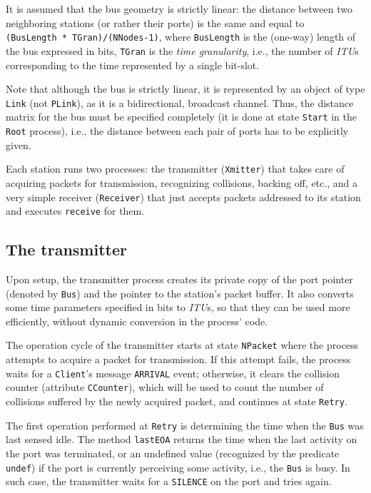 It is assumed that the bus geometry is strictly linear: the distance between
two neighboring stations (or rather their ports) is the same and equal to
{\tt (BusLength~*~TGran)/(NNodes-1)}, where {\tt BusLength} is the (one-way)
length of the bus expressed in bits, {\tt TGran} is the {\em time granularity},
i.e., the number of {\em ITU\/}s corresponding to the time represented by a
single bit-slot.

Note that although the bus is strictly linear, it is represented by an
object of type {\tt Link} (not {\tt PLink}), as it is a bidirectional,
broadcast channel.
Thus, the distance matrix for the bus must be specified completely
(it is done at state {\tt Start} in the {\tt Root} process), i.e.,
the distance between each pair of ports has to be explicitly given.

Each station runs two processes: the transmitter ({\tt Xmitter}) that takes
care of acquiring packets for transmission, recognizing collisions,
backing off, etc., and a very simple receiver ({\tt Receiver}) that just
accepts packets addressed to its station and executes {\tt receive} for
them.

\subsection{The transmitter}

Upon setup, the transmitter process creates its private copy of the
port pointer (denoted by {\tt Bus}) and the pointer to the
station's packet buffer.
It also converts some time parameters specified in bits to {\em ITU\/}s,
so that they can be used more efficiently, without dynamic conversion in
the process' code.

The operation cycle of the transmitter starts at state {\tt NPacket} where
the process attempts to acquire a packet for transmission.
If this attempt fails, the process waits for a {\tt Client}'s message
{\tt ARRIVAL} event; otherwise, it clears the collision counter
(attribute {\tt CCounter}), which will be used to count the number of
collisions suffered by the newly acquired packet, and continues at
state {\tt Retry}.

The first operation performed at {\tt Retry} is determining the time
when the {\tt Bus} was last sensed idle.
The method {\tt lastEOA} returns the time when the last activity on the
port was terminated, or an undefined value (recognized by the predicate
{\tt undef}) if the port is currently perceiving some activity, i.e., the
{\tt Bus} is busy.
In such case, the transmitter waits for a {\tt SILENCE} on the port and tries
again.

